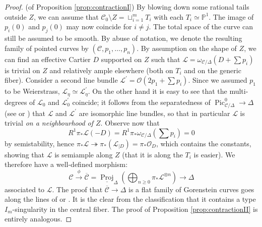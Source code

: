 \documentclass[11pt]{amsart}
\newcommand{\PP}{\mathbb P}
\newcommand{\OO}{\mathcal O}
\renewcommand{\to}{\rightarrow}
\newcommand{\dvr}{\Delta}
\newcommand{\Pic}{\operatorname{Pic}}
\theoremstyle{plain}
\theoremstyle{definition}
\begin{document}
\begin{proof}(of Proposition \ref{prop:contractionI})
 By blowing down some rational tails outside $Z$, we can assume that $\mathcal C_0\setminus Z=\sqcup_{i=1}^m T_i$ with each $T_i\simeq\PP^1$. The image of $p_i(0)$ and $p_j(0)$ may now coincide for $i\neq j$. The total space of the curve can still be assumed to be smooth. By abuse of notation, we denote the resulting family of pointed curves by $(\mathcal C,p_1,\ldots,p_n)$. By assumption on the shape of $Z$, we can find an effective Cartier $D$ supported on $Z$ such that $\mathcal L=\omega_{\mathcal C/\dvr}(D+\sum p_i)$ is trivial on $Z$ and relatively ample elsewhere (both on $T_i$ and on the generic fiber). Consider a second line bundle $\mathcal L^\prime=\OO(2p_1+\sum p_i)$. Since we assumed $p_1$ to be Weierstrass, $\mathcal L_\eta\simeq\mathcal L^\prime_\eta$. On the other hand it is easy to see that the multi-degrees of $\mathcal L_0$ and $\mathcal L^\prime_0$ coincide; it follows from the separatedness of $\Pic^0_{\mathcal C/\dvr}\to\dvr$ (see \cite[p. 136]{Deligne-Gabber} or \cite[\S 9.4]{BLR}) that $\mathcal L$ and $\mathcal L^\prime$ are isomorphic line bundles, so that in particular $\mathcal L$ is trivial \emph{on a neighbourhood of $Z$}. Observe now that 
 \[R^1\pi_*\mathcal L(-D)= R^1\pi_*\omega_{\mathcal C/\dvr}(\sum p_i)=0\]
 by semistability, hence $\pi_*\mathcal L\twoheadrightarrow \pi_*(\mathcal L_{|D})=\pi_*\OO_D$, which contains the constants, showing that $\mathcal L$ is semiample along $Z$ (that it is along the $T_i$ is easier). We therefore have a well-defined  morphism:
 \[\mathcal C\xrightarrow{\phi}\overline{\mathcal C}=\underline{\operatorname{Proj}}_\dvr\left(\bigoplus_{n\geq 0}\pi_*\mathcal L^{\otimes n}\right)\to\dvr\]
 associated to $\mathcal L$. The proof that $\overline{\mathcal C}\to \dvr$ is a flat family of Gorenstein curves goes along the lines of \cite[Lemma 2.13]{SMY1} or \cite[Proposition 3.7.3.1]{RSPW1}. It is the clear from the classification that it contains a type $I_m$-singularity in the central fiber. The proof of Proposition \ref{prop:contractionII} is entirely analogous.
\end{proof}
\end{document}

